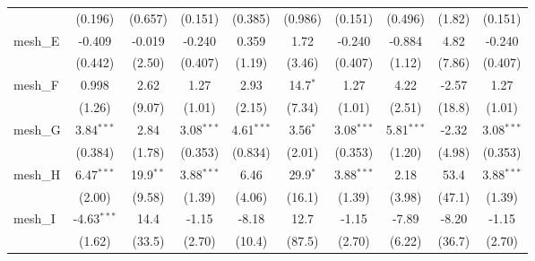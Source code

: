 \begin{tabular}{lccccccccc}
                                                               & (0.196)       & (0.657)        & (0.151)       & (0.385)       & (0.986)       & (0.151)       & (0.496)       & (1.82)         & (0.151)\\   
   mesh\_E                                                     & -0.409        & -0.019         & -0.240        & 0.359         & 1.72          & -0.240        & -0.884        & 4.82           & -0.240\\   
                                                               & (0.442)       & (2.50)         & (0.407)       & (1.19)        & (3.46)        & (0.407)       & (1.12)        & (7.86)         & (0.407)\\   
   mesh\_F                                                     & 0.998         & 2.62           & 1.27          & 2.93          & 14.7$^{*}$    & 1.27          & 4.22          & -2.57          & 1.27\\   
                                                               & (1.26)        & (9.07)         & (1.01)        & (2.15)        & (7.34)        & (1.01)        & (2.51)        & (18.8)         & (1.01)\\   
   mesh\_G                                                     & 3.84$^{***}$  & 2.84           & 3.08$^{***}$  & 4.61$^{***}$  & 3.56$^{*}$    & 3.08$^{***}$  & 5.81$^{***}$  & -2.32          & 3.08$^{***}$\\   
                                                               & (0.384)       & (1.78)         & (0.353)       & (0.834)       & (2.01)        & (0.353)       & (1.20)        & (4.98)         & (0.353)\\   
   mesh\_H                                                     & 6.47$^{***}$  & 19.9$^{**}$    & 3.88$^{***}$  & 6.46          & 29.9$^{*}$    & 3.88$^{***}$  & 2.18          & 53.4           & 3.88$^{***}$\\   
                                                               & (2.00)        & (9.58)         & (1.39)        & (4.06)        & (16.1)        & (1.39)        & (3.98)        & (47.1)         & (1.39)\\   
   mesh\_I                                                     & -4.63$^{***}$ & 14.4           & -1.15         & -8.18         & 12.7          & -1.15         & -7.89         & -8.20          & -1.15\\   
                                                               & (1.62)        & (33.5)         & (2.70)        & (10.4)        & (87.5)        & (2.70)        & (6.22)        & (36.7)         & (2.70)\\   

\end{tabular}
